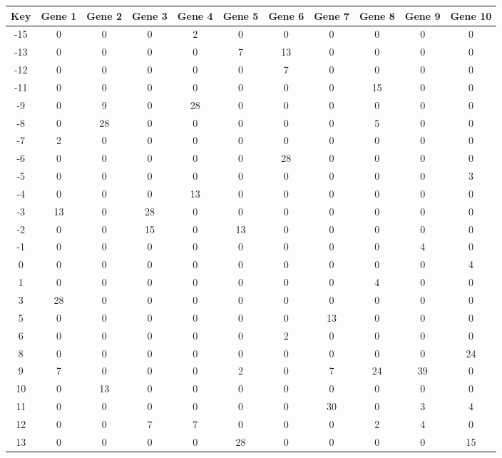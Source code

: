 \begin{tabular}{|c|c|c|c|c|c|c|c|c|c|c|}
\hline
Key & Gene 1 & Gene 2 & Gene 3 & Gene 4 & Gene 5 & Gene 6 & Gene 7 & Gene 8 & Gene 9 & Gene 10 \\
\hline
-15 & 0 & 0 & 0 & 2 & 0 & 0 & 0 & 0 & 0 & 0 \\
-13 & 0 & 0 & 0 & 0 & 7 & 13 & 0 & 0 & 0 & 0 \\
-12 & 0 & 0 & 0 & 0 & 0 & 7 & 0 & 0 & 0 & 0 \\
-11 & 0 & 0 & 0 & 0 & 0 & 0 & 0 & 15 & 0 & 0 \\
-9 & 0 & 9 & 0 & 28 & 0 & 0 & 0 & 0 & 0 & 0 \\
-8 & 0 & 28 & 0 & 0 & 0 & 0 & 0 & 5 & 0 & 0 \\
-7 & 2 & 0 & 0 & 0 & 0 & 0 & 0 & 0 & 0 & 0 \\
-6 & 0 & 0 & 0 & 0 & 0 & 28 & 0 & 0 & 0 & 0 \\
-5 & 0 & 0 & 0 & 0 & 0 & 0 & 0 & 0 & 0 & 3 \\
-4 & 0 & 0 & 0 & 13 & 0 & 0 & 0 & 0 & 0 & 0 \\
-3 & 13 & 0 & 28 & 0 & 0 & 0 & 0 & 0 & 0 & 0 \\
-2 & 0 & 0 & 15 & 0 & 13 & 0 & 0 & 0 & 0 & 0 \\
-1 & 0 & 0 & 0 & 0 & 0 & 0 & 0 & 0 & 4 & 0 \\
0 & 0 & 0 & 0 & 0 & 0 & 0 & 0 & 0 & 0 & 4 \\
1 & 0 & 0 & 0 & 0 & 0 & 0 & 0 & 4 & 0 & 0 \\
3 & 28 & 0 & 0 & 0 & 0 & 0 & 0 & 0 & 0 & 0 \\
5 & 0 & 0 & 0 & 0 & 0 & 0 & 13 & 0 & 0 & 0 \\
6 & 0 & 0 & 0 & 0 & 0 & 2 & 0 & 0 & 0 & 0 \\
8 & 0 & 0 & 0 & 0 & 0 & 0 & 0 & 0 & 0 & 24 \\
9 & 7 & 0 & 0 & 0 & 2 & 0 & 7 & 24 & 39 & 0 \\
10 & 0 & 13 & 0 & 0 & 0 & 0 & 0 & 0 & 0 & 0 \\
11 & 0 & 0 & 0 & 0 & 0 & 0 & 30 & 0 & 3 & 4 \\
12 & 0 & 0 & 7 & 7 & 0 & 0 & 0 & 2 & 4 & 0 \\
13 & 0 & 0 & 0 & 0 & 28 & 0 & 0 & 0 & 0 & 15 \\
\hline
\end{tabular}